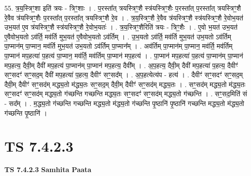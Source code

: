 \documentclass[17pt]{extarticle}
\begin{document}
55. त्र॒य॒स्त्रिꣳ॒॒शा इति॑ त्रयः - त्रिꣳ॒॒शाः । . प॒रस्ता᳚त् त्रयस्त्रिꣳ॒॒शै स्त्र॑यस्त्रिꣳ॒॒शैः प॒रस्ता᳚त् प॒रस्ता᳚त् त्रयस्त्रिꣳ॒॒शै रे॒वैव त्र॑यस्त्रिꣳ॒॒शैः प॒रस्ता᳚त् प॒रस्ता᳚त् त्रयस्त्रिꣳ॒॒शै रे॒व । . त्र॒य॒स्त्रिꣳ॒॒शै रे॒वैव त्र॑यस्त्रिꣳ॒॒शै स्त्र॑यस्त्रिꣳ॒॒शै रे॒वोभ॒यत॑ उभ॒यत॑ ए॒व त्र॑यस्त्रिꣳ॒॒शै स्त्र॑यस्त्रिꣳ॒॒शै रे॒वोभ॒यतः॑ । . त्र॒य॒स्त्रिꣳ॒॒शैरिति॑ त्रयः - त्रिꣳ॒॒शैः । . ए॒वो भ॒यत॑ उभ॒यत॑ ए॒वैवोभ॒यतो ऽव॑र्ति॒ मव॑र्ति मुभ॒यत॑ ए॒वैवोभ॒यतो ऽव॑र्तिम् । . उ॒भ॒यतो ऽव॑र्ति॒ मव॑र्ति मुभ॒यत॑ उभ॒यतो ऽव॑र्तिम् पा॒प्मान॑म् पा॒प्मान॒ मव॑र्ति मुभ॒यत॑ उभ॒यतो ऽव॑र्तिम् पा॒प्मान᳚म् । . अव॑र्तिम् पा॒प्मान॑म् पा॒प्मान॒ मव॑र्ति॒ मव॑र्तिम् पा॒प्मान॑ मप॒हत्या॑ प॒हत्य॑ पा॒प्मान॒ मव॑र्ति॒ मव॑र्तिम् पा॒प्मान॑ मप॒हत्य॑ । . पा॒प्मान॑ मप॒हत्या॑ प॒हत्य॑ पा॒प्मान॑म् पा॒प्मान॑ मप॒हत्य॒ दैवी॒म् दैवी॑ मप॒हत्य॑ पा॒प्मान॑म् पा॒प्मान॑ मप॒हत्य॒ दैवी᳚म् । . अ॒प॒हत्य॒ दैवी॒म् दैवी॑ मप॒हत्या॑ प॒हत्य॒ दैवीꣳ॑ सꣳ॒॒सदꣳ॑ सꣳ॒॒सद॒म् दैवी॑ मप॒हत्या॑ प॒हत्य॒ दैवीꣳ॑ सꣳ॒॒सद᳚म् । . अ॒प॒हत्येत्य॑प - हत्य॑ । . दैवीꣳ॑ सꣳ॒॒सदꣳ॑ सꣳ॒॒सद॒म् दैवी॒म् दैवीꣳ॑ सꣳ॒॒सद॑म् मद्ध्य॒तो म॑द्ध्य॒तः सꣳ॒॒सद॒म् दैवी॒म् दैवीꣳ॑ सꣳ॒॒सद॑म् मद्ध्य॒तः । . सꣳ॒॒सद॑म् मद्ध्य॒तो म॑द्ध्य॒तः सꣳ॒॒सदꣳ॑ सꣳ॒॒सद॑म् मद्ध्य॒तो ग॑च्छन्ति गच्छन्ति मद्ध्य॒तः सꣳ॒॒सदꣳ॑ सꣳ॒॒सद॑म् मद्ध्य॒तो ग॑च्छन्ति । . सꣳ॒॒सद॒मिति॑ सं - सद᳚म् । . म॒द्ध्य॒तो ग॑च्छन्ति गच्छन्ति मद्ध्य॒तो म॑द्ध्य॒तो ग॑च्छन्ति पृ॒ष्ठानि॑ पृ॒ष्ठानि॑ गच्छन्ति मद्ध्य॒तो म॑द्ध्य॒तो ग॑च्छन्ति पृ॒ष्ठानि॑ । \newline
\pagebreak
{}

\section{ TS 7.4.2.3 }

\textbf{TS 7.4.2.3 } \newline
\textbf{Samhita Paata} \newline
\end{document}
